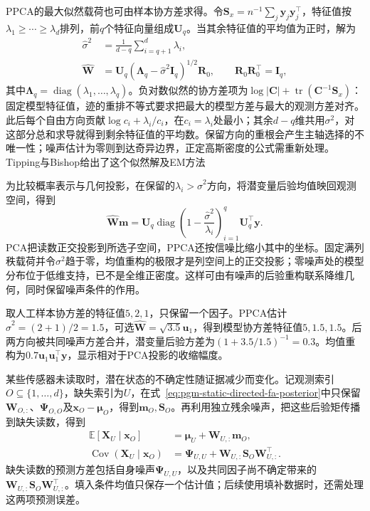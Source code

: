 PPCA的最大似然载荷也可由样本协方差求得。令$\bm S_x=n^{-1}\sum_j\bm y_j\bm y_j^\top$，特征值按$\lambda_1\ge\cdots\ge\lambda_d$排列，前$q$个特征向量组成$\bm U_q$。当其余特征值的平均值为正时，解为
\begin{equation}
  \label{eq:pgm-static-directed-ppca-ml}
  \begin{aligned}
    \widehat{\sigma}^2
      &=\frac{1}{d-q}\sum_{i=q+1}^{d}\lambda_i,\\
    \widehat{\bm{W}}
      &=\bm{U}_q
       (\bm{\Lambda}_q-\widehat{\sigma}^2\bm{I}_q)^{1/2}
       \bm{R}_0,\qquad
       \bm{R}_0\bm{R}_0^\top=\bm{I}_q,
  \end{aligned}
\end{equation}
其中$\bm\Lambda_q=\operatorname{diag}(\lambda_1,\ldots,\lambda_q)$。负对数似然的协方差项为$\log|\bm C|+\operatorname{tr}(\bm C^{-1}\bm S_x)$：固定模型特征值，迹的重排不等式要求把最大的模型方差与最大的观测方差对齐。此后每个自由方向贡献$\log c_i+\lambda_i/c_i$，在$c_i=\lambda_i$处最小；其余$d-q$维共用$\sigma^2$，对这部分总和求导就得到剩余特征值的平均数。保留方向的重根会产生主轴选择的不唯一性；噪声估计为零则到达奇异边界，正定高斯密度的公式需重新处理。Tipping与Bishop给出了这个似然解及EM方法

为比较概率表示与几何投影，在保留的$\lambda_i>\widehat\sigma^2$方向，将潜变量后验均值映回观测空间，得到
\[
  \widehat{\bm{W}}\bm{m}
    =\bm{U}_q\operatorname{diag}
       \left(1-\frac{\widehat{\sigma}^2}{\lambda_i}\right)_{i=1}^{q}
       \bm{U}_q^\top\bm{y}.
\]
PCA把读数正交投影到所选子空间，PPCA还按信噪比缩小其中的坐标。固定满列秩载荷并令$\sigma^2$趋于零，均值重构的极限才是列空间上的正交投影；零噪声处的模型分布位于低维支持，已不是全维正密度。这样可由有噪声的后验重构联系降维几何，同时保留噪声条件的作用。

取人工样本协方差的特征值$5,2,1$，只保留一个因子。PPCA估计$\widehat\sigma^2=(2+1)/2=1.5$，可选$\widehat{\bm W}=\sqrt{3.5}\bm u_1$，得到模型协方差特征值$5,1.5,1.5$。后两方向被共同噪声方差合并，潜变量后验方差为$(1+3.5/1.5)^{-1}=0.3$。均值重构为$0.7\bm u_1\bm u_1^\top\bm y$，显示相对于PCA投影的收缩幅度。

某些传感器未读取时，潜在状态的不确定性随证据减少而变化。记观测索引$O\subseteq\{1,\ldots,d\}$，缺失索引为$U$，在式~\eqref{eq:pgm-static-directed-fa-posterior}中只保留$\bm W_{O,:}$、$\bm\Psi_{O,O}$及$\bm x_O-\bm\mu_O$，得到$\bm m_O,\bm S_O$。再利用独立残余噪声，把这些后验矩传播到缺失读数，得到
\begin{equation}
  \label{eq:pgm-static-directed-fa-missing}
  \begin{aligned}
    \mathbb{E}[\bm{X}_U\mid\bm{x}_O]
      &=\bm{\mu}_U+\bm{W}_{U,:}\bm{m}_O,\\
    \operatorname{Cov}(\bm{X}_U\mid\bm{x}_O)
      &=\bm{\Psi}_{U,U}
        +\bm{W}_{U,:}\bm{S}_O\bm{W}_{U,:}^\top.
  \end{aligned}
\end{equation}
缺失读数的预测方差包括自身噪声$\bm\Psi_{U,U}$，以及共同因子尚不确定带来的$\bm W_{U,:}\bm S_O\bm W_{U,:}^\top$。填入条件均值只保存一个估计值；后续使用填补数据时，还需处理这两项预测误差。

